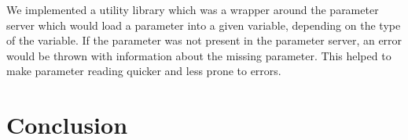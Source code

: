 \documentclass[10pt,a4paper,twocolumn]{article}
\begin{document}
We implemented a utility library which was a wrapper around the parameter server
which would load a parameter into a given variable, depending on the type of the
variable. If the parameter was not present in the parameter server, an error
would be thrown with information about the missing parameter. This helped to
make parameter reading quicker and less prone to errors.

\section{Conclusion}

\nocite{*}
\printbibliography
\end{document}
